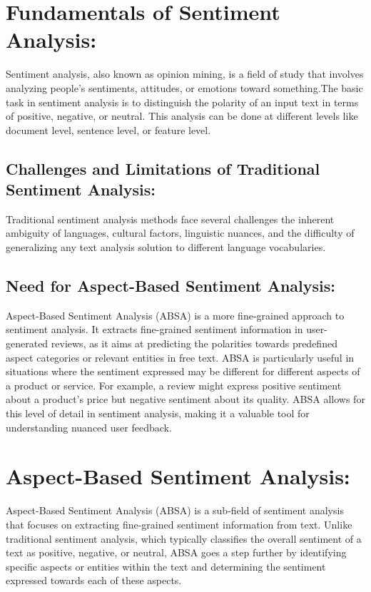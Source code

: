\documentclass{article}
\begin{document}
\section{Fundamentals of Sentiment Analysis: }
Sentiment analysis, also known as opinion mining, is a field of study that involves analyzing people's sentiments, attitudes, or emotions toward something.\cite{NazirIssues&Chall2023}The basic task in sentiment analysis is to distinguish the polarity of an input text in terms of positive, negative, or neutral. This analysis can be done at different levels like document level, sentence level, or feature level.\cite{doi:10.1504/IJESMS.2021.119892}

\subsection{Challenges and Limitations of Traditional Sentiment Analysis: }    
 Traditional sentiment analysis methods face several challenges the inherent ambiguity of languages, cultural factors, linguistic nuances, and the difficulty of generalizing any text analysis solution to different language vocabularies.\cite{NazirIssues&Chall2023} 

\subsection{Need for Aspect-Based Sentiment Analysis:}
Aspect-Based Sentiment Analysis (ABSA) is a more fine-grained approach to sentiment analysis. It extracts fine-grained sentiment information in user-generated reviews, as it aims at predicting the polarities towards predefined aspect categories or relevant entities in free text.\cite{Feng2022UnrestrictedAM} ABSA is particularly useful in situations where the sentiment expressed may be different for different aspects of a product or service. For example, a review might express positive sentiment about a product's price but negative sentiment about its quality. ABSA allows for this level of detail in sentiment analysis, making it a valuable tool for understanding nuanced user feedback.\cite{Feng2022UnrestrictedAM}

\section{Aspect-Based Sentiment Analysis:}
Aspect-Based Sentiment Analysis (ABSA) is a sub-field of sentiment analysis that focuses on extracting fine-grained sentiment information from text. Unlike traditional sentiment analysis, which typically classifies the overall sentiment of a text as positive, negative, or neutral, ABSA goes a step further by identifying specific aspects or entities within the text and determining the sentiment expressed towards each of these aspects.\cite{doi:10.1504/IJESMS.2021.119892} \cite{NazirIssues&Chall2023}
\end{document}
